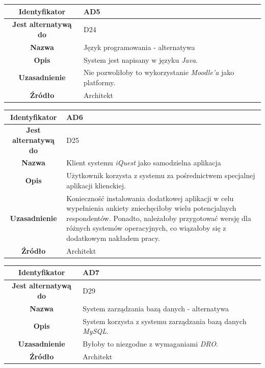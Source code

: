 \begin{table}[H]
\centering
\begin{tabular}{ | >{\bfseries}c | p{11cm} | }
\hline
%
Identyfikator & AD5 \\ \hline
Jest alternatywą do & D24 \\ \hline
Nazwa & Język programowania - alternatywa \\ \hline
Opis &  	System jest napisany w języku \textit{Java}. \\ \hline
Uzasadnienie & Nie pozwoliłoby to wykorzystanie \textit{Moodle'a} jako platformy. \\ \hline
Źródło & Architekt \\ \hline
%
\end{tabular}
\end{table}

\begin{table}[H]
\centering
\begin{tabular}{ | >{\bfseries}c | p{11cm} | }
\hline
%
Identyfikator & AD6 \\ \hline
Jest alternatywą do & D25 \\ \hline
Nazwa & Klient systemu \textit{iQuest} jako samodzielna aplikacja \\ \hline
Opis & Użytkownik korzysta z systemu za pośrednictwem specjalnej aplikacji klienckiej. \\ \hline
Uzasadnienie & Konieczność instalowania dodatkowej aplikacji w celu wypełnienia ankiety zniechęciłoby wielu potencjalnych respondentów. Ponadto, należałoby przygotować wersję dla różnych systemów operacyjnych, co wiązałoby się z dodatkowym nakładem pracy. \\ \hline
Źródło & Architekt \\ \hline
%
\end{tabular}
\end{table}

\begin{table}[H]
\centering
\begin{tabular}{ | >{\bfseries}c | p{11cm} | }
\hline
%
Identyfikator & AD7 \\ \hline
Jest alternatywą do & D29 \\ \hline
Nazwa & System zarządzania bazą danych - alternatywa \\ \hline
Opis & System korzysta z systemu zarządzania bazą danych \textit{MySQL}. \\ \hline
Uzasadnienie & Byłoby to niezgodne z wymaganiami \textit{DRO}. \\ \hline
Źródło & Architekt \\ \hline
%
\end{tabular}
\end{table}

